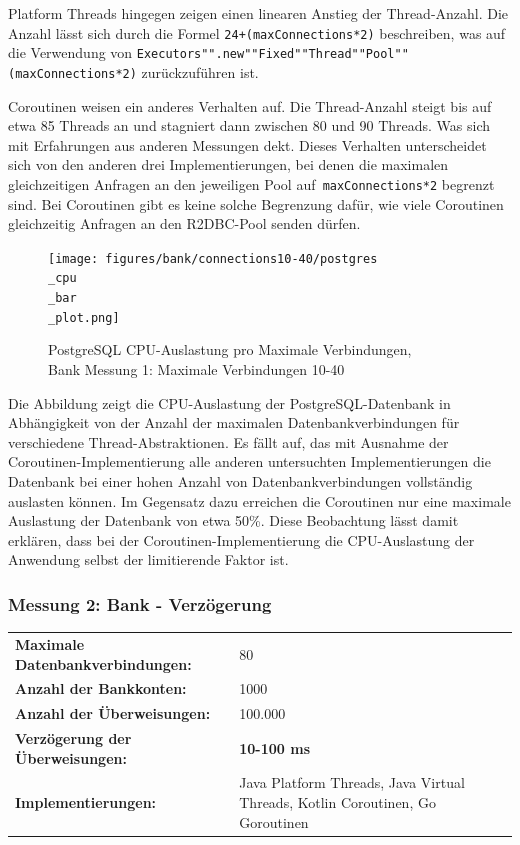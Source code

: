 \documentclass[fontsize=12pt,paper=a4,twoside=semi,parskip=half-,headsepline,headinclude]{scrreprt}
\begin{document}
Platform Threads hingegen zeigen einen linearen Anstieg der Thread-Anzahl. Die Anzahl lässt sich durch die Formel \texttt{24+(maxConnections*2)} beschreiben, was auf die Verwendung von \texttt{Executors"".new""Fixed""Thread""Pool""(maxConnections*2)} zurückzuführen ist.

Coroutinen weisen ein anderes Verhalten auf. Die Thread-Anzahl steigt bis auf etwa 85 Threads an und stagniert dann zwischen 80 und 90 Threads. Was sich mit Erfahrungen aus anderen Messungen dekt. Dieses Verhalten unterscheidet sich von den anderen drei Implementierungen, bei denen die maximalen gleichzeitigen Anfragen an den jeweiligen Pool auf\texttt{ maxConnections*2} begrenzt sind. Bei Coroutinen gibt es keine solche Begrenzung dafür, wie viele Coroutinen gleichzeitig Anfragen an den R2DBC-Pool senden dürfen.

\begin{figure}[H]
	\centering
	\texttt{[image: figures/bank/connections10-40/postgres\\\_cpu\\\_bar\\\_plot.png]}
	\caption{PostgreSQL CPU-Auslastung pro Maximale Verbindungen,\\ Bank Messung 1: Maximale Verbindungen 10-40}
	\label{fig:bankConnPostgCPU}
\end{figure}

Die Abbildung zeigt die CPU-Auslastung der PostgreSQL-Datenbank in Abhängigkeit von der Anzahl der maximalen Datenbankverbindungen für verschiedene Thread-Abstraktionen. Es fällt auf, das mit Ausnahme der Coroutinen-Implementierung alle anderen untersuchten Implementierungen die Datenbank bei einer hohen Anzahl von Datenbankverbindungen vollständig auslasten können. Im Gegensatz dazu erreichen die Coroutinen nur eine maximale Auslastung der Datenbank von etwa 50\%. Diese Beobachtung lässt damit erklären, dass bei der Coroutinen-Implementierung die CPU-Auslastung der Anwendung selbst der limitierende Faktor ist.

\subsubsection{Messung 2: Bank - Verzögerung}

\begin{tabularx}{\textwidth}{@{}lX@{}}
	\textbf{Maximale Datenbankverbindungen:} & 80 \\
	\textbf{Anzahl der Bankkonten:} & 1000 \\
	\textbf{Anzahl der Überweisungen:} & 100.000 \\
	\textbf{Verzögerung der Überweisungen:} & \textbf{10-100 ms} \\
	\textbf{Implementierungen:} & Java Platform Threads, Java Virtual Threads, Kotlin Coroutinen, Go Goroutinen
\end{tabularx}
\end{document}
